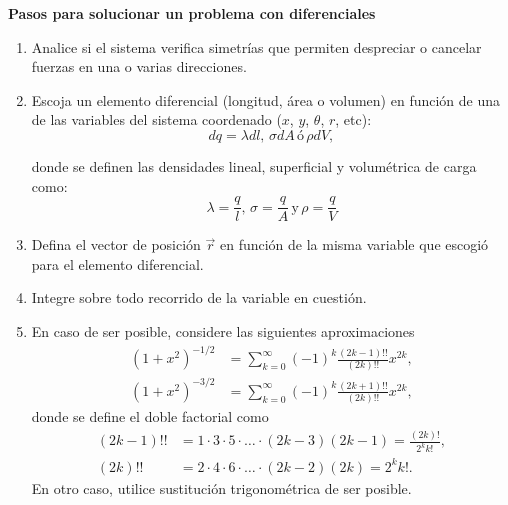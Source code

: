 \begin{frame}{}

    \textbf{Pasos para solucionar un problema con diferenciales}

    \begin{enumerate}
        \item Analice si el sistema verifica simetrías que permiten despreciar o cancelar fuerzas en una o varias direcciones. 
        \item Escoja un elemento diferencial (longitud, área o volumen) en función de una de las variables del sistema coordenado ($x$, $y$, $\theta$, $r$, etc):
        \begin{equation*}
            dq = \lambda dl,\, \sigma dA\, \text{ó}\, \rho dV,
        \end{equation*}

        donde se definen las densidades lineal, superficial y volumétrica de carga como:
        \begin{equation*}
            \lambda = \frac{q}{l},\, \sigma = \frac{q}{A}\, \text{y}\, \rho = \frac{q}{V}
        \end{equation*}
        \item Defina el vector de posición $\vec{r}$ en función de la misma variable que escogió para el elemento diferencial.
        \item Integre sobre todo recorrido de la variable en cuestión.
    \end{enumerate}
    
\end{frame}

\begin{frame}{}
    \begin{enumerate}
        \setcounter{enumi}{4}
        \item En caso de ser posible, considere las siguientes aproximaciones
        \begin{equation*}
        \begin{aligned}
            (1+x^2)^{-1/2}&=\sum_{k=0}^\infty (-1)^k\frac{(2k-1)!!}{(2k)!!}x^{2k},\\
            (1+x^2)^{-3/2}&=\sum_{k=0}^\infty (-1)^k\frac{(2k+1)!!}{(2k)!!}x^{2k},
        \end{aligned}
        \end{equation*}
        donde se define el doble factorial como 
        \begin{equation*}
            \begin{aligned}
            (2k-1)!!&=1\cdot3\cdot5\cdot\dots\cdot(2k-3)(2k-1)=\frac{(2k)!}{2^kk!},\\
            (2k)!!&=2\cdot4\cdot6\cdot\dots\cdot(2k-2)(2k)=2^kk!.
            \end{aligned}
        \end{equation*}
        En otro caso, utilice sustitución trigonométrica de ser posible.
    \end{enumerate}
\end{frame}

